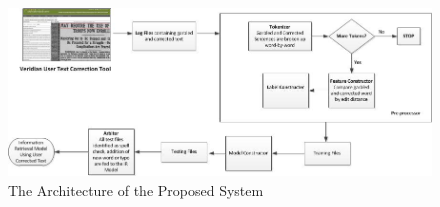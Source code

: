 \documentclass[letterpaper]{article}
\begin{document}


\begin{figure}[t]
\centering
\includegraphics[width=0.8\textheight]{./image/archOCR.jpg}
\caption{The Architecture of the Proposed System}
\label{fig:arch}
\end{figure}
\end{document}
